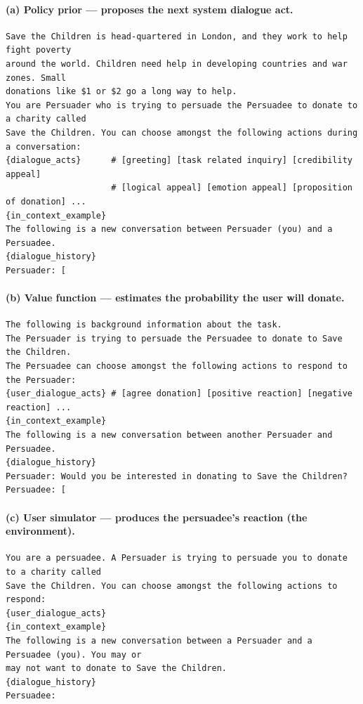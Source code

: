 \paragraph{(a) Policy prior --- proposes the next system dialogue act.}
\begin{lstlisting}[style=prompt]
Save the Children is head-quartered in London, and they work to help fight poverty
around the world. Children need help in developing countries and war zones. Small
donations like $1 or $2 go a long way to help.
You are Persuader who is trying to persuade the Persuadee to donate to a charity called
Save the Children. You can choose amongst the following actions during a conversation:
{dialogue_acts}      # [greeting] [task related inquiry] [credibility appeal]
                     # [logical appeal] [emotion appeal] [proposition of donation] ...
{in_context_example}
The following is a new conversation between Persuader (you) and a Persuadee.
{dialogue_history}
Persuader: [
\end{lstlisting}

\paragraph{(b) Value function --- estimates the probability the user will donate.}
\begin{lstlisting}[style=prompt]
The following is background information about the task.
The Persuader is trying to persuade the Persuadee to donate to Save the Children.
The Persuadee can choose amongst the following actions to respond to the Persuader:
{user_dialogue_acts} # [agree donation] [positive reaction] [negative reaction] ...
{in_context_example}
The following is a new conversation between another Persuader and Persuadee.
{dialogue_history}
Persuader: Would you be interested in donating to Save the Children?
Persuadee: [
\end{lstlisting}

\paragraph{(c) User simulator --- produces the persuadee's reaction (the environment).}
\begin{lstlisting}[style=prompt]
You are a persuadee. A Persuader is trying to persuade you to donate to a charity called
Save the Children. You can choose amongst the following actions to respond:
{user_dialogue_acts}
{in_context_example}
The following is a new conversation between a Persuader and a Persuadee (you). You may or
may not want to donate to Save the Children.
{dialogue_history}
Persuadee:
\end{lstlisting}

